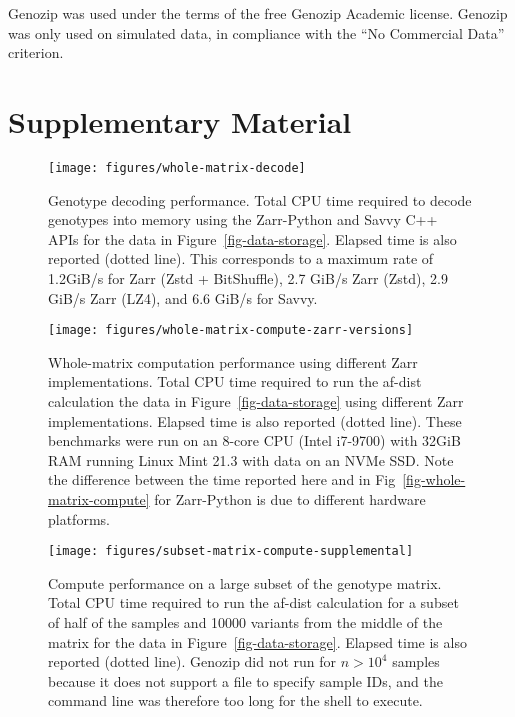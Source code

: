 \documentclass[a4paper,num-refs]{oup-contemporary}
\begin{document}
Genozip was used under the terms of the free Genozip Academic license.
Genozip was only used on simulated data, in compliance with
the ``No Commercial Data'' criterion.



\renewcommand\thefigure{S\arabic{figure}}
\setcounter{figure}{0}
\renewcommand\thetable{S\arabic{table}}
\setcounter{table}{0}

\section*{Supplementary Material}

\begin{figure}[h]
\texttt{[image: figures/whole-matrix-decode]}
\caption{Genotype decoding performance.
Total CPU time required to decode genotypes into memory using the Zarr-Python
and Savvy C++ APIs for the data in Figure~\ref{fig-data-storage}.
Elapsed time is also reported (dotted line).
This corresponds to a maximum rate of 1.2GiB/s for Zarr (Zstd + BitShuffle),
2.7 GiB/s Zarr (Zstd), 2.9 GiB/s Zarr (LZ4), and 6.6 GiB/s for Savvy.
\label{fig-whole-matrix-decode}}
\end{figure}

\begin{figure}[h]
\texttt{[image: figures/whole-matrix-compute-zarr-versions]}
\caption{Whole-matrix computation performance using different Zarr
implementations.
Total CPU time required to run the af-dist calculation
the data in Figure~\ref{fig-data-storage} using different Zarr implementations.
Elapsed time is also reported (dotted line).
These benchmarks were run on an 8-core CPU (Intel i7-9700) with 32GiB RAM running
Linux Mint 21.3 with data on an NVMe SSD.
Note the difference between the
time reported here and in Fig~\ref{fig-whole-matrix-compute} for Zarr-Python
is due to different hardware platforms.
\label{fig-whole-matrix-compute-zarr-versions}}
\end{figure}

\begin{figure}[h]
\texttt{[image: figures/subset-matrix-compute-supplemental]}
\caption{Compute performance on a large subset of the genotype matrix.
Total CPU time required to run the af-dist calculation for
a subset of half of the samples and 10000 variants from the middle of the matrix
for the data in Figure~\ref{fig-data-storage}.
Elapsed time is also reported (dotted line).
Genozip did not run for
$n > 10^4$ samples because it does not support a file to specify
sample IDs, and the command line was therefore too long for the shell
to execute.
\label{fig-subset-matrix-compute-supplemental}}
\end{figure}
\end{document}
